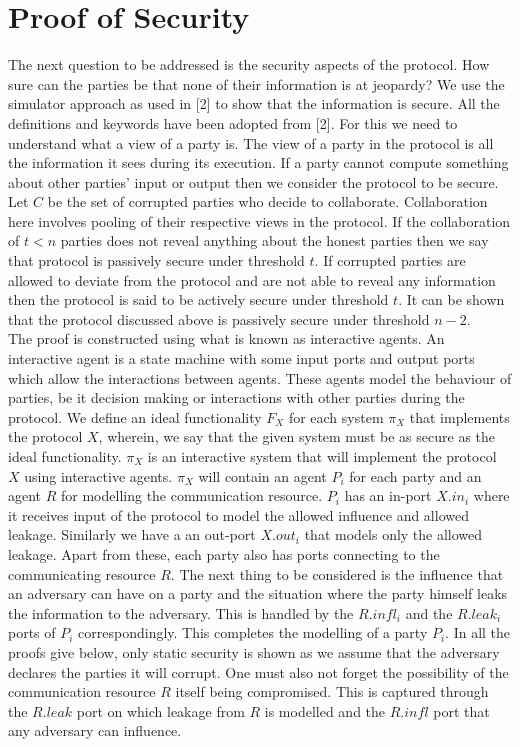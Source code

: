 \documentclass{llncs}
\begin{document}
\section{Proof of Security}
The next question to be addressed is the security aspects of the protocol. How sure can the parties be that none of their information is at jeopardy? We use the simulator approach as used in [2] to show that the information is secure. All the definitions and keywords have been adopted from [2]. For this we need to understand what a view of a party is. The view of a party in the protocol is all the information it sees during its execution. If a party cannot compute something about other parties' input or output then we consider the protocol to be secure.  Let $C$ be the set of corrupted parties who decide to collaborate. Collaboration here involves pooling of their respective views in the protocol. If the collaboration of $t<n$ parties does not reveal anything about the honest parties then we say that protocol is passively secure under threshold $t$. If corrupted parties are allowed to deviate from the protocol and are not able to reveal any information then the protocol is said to be actively secure under threshold $t$. It can be shown that the protocol discussed above is passively secure under threshold $n-2$.\\ %

The proof is constructed using what is known as interactive agents. An interactive agent is a state machine with some input ports and output ports which allow the interactions between agents. These agents model the behaviour of parties, be it decision making or interactions with other parties during the protocol. We define an ideal functionality $F_X$ for each system $\pi_X$ that implements the protocol $X$, wherein, we say that the given system must be as secure as the ideal functionality. $\pi_X$ is an interactive system that will implement the protocol $X$ using interactive agents. $\pi_X$ will contain an agent $P_i$ for each party and an agent $R$ for modelling the communication resource. $P_i$ has an in-port $X.in_i$ where it receives input of the protocol to model the allowed influence and allowed leakage. Similarly we have a an out-port $X.out_i$ that models only the allowed leakage. Apart from these, each party also has ports connecting to the communicating resource $R$. The next thing to be considered is the influence that an adversary can have on a party and the situation where the party himself leaks the information to the adversary. This is handled by the $R.infl_i$ and the $R.leak_i$ ports of $P_i$ correspondingly. This completes the modelling of a party $P_i$. In all the proofs give below, only static security is shown as we assume that the adversary declares the parties it will corrupt. One must also not forget the possibility of the communication resource $R$ itself being compromised. This is captured through the $R.leak$ port on which leakage from $R$ is modelled and the $R.infl$ port that any adversary can influence. \\
\end{document}
